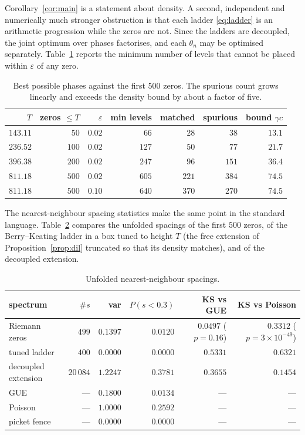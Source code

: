 \documentclass[11pt,a4paper]{article}
\theoremstyle{remark}
\begin{document}
Corollary~\ref{cor:main} is a statement about density. A second, independent and numerically much
stronger obstruction is that each ladder \eqref{eq:ladder} is an arithmetic progression while the
zeros are not. Since the ladders are decoupled, the joint optimum over phases factorises, and each
$\theta_n$ may be optimised separately. Table~\ref{tab:rigid} reports the minimum number of levels
that cannot be placed within $\varepsilon$ of any zero.

\begin{table}[h]
\centering
\begin{tabular}{rrrrrrr}
\toprule
$T$ & zeros $\le T$ & $\varepsilon$ & min levels & matched & spurious & bound $\gamma c$\\
\midrule
$143.11$ & $50$  & $0.02$ & $66$  & $28$  & $38$  & $13.1$\\
$236.52$ & $100$ & $0.02$ & $127$ & $50$  & $77$  & $21.7$\\
$396.38$ & $200$ & $0.02$ & $247$ & $96$  & $151$ & $36.4$\\
$811.18$ & $500$ & $0.02$ & $605$ & $221$ & $384$ & $74.5$\\
$811.18$ & $500$ & $0.10$ & $640$ & $370$ & $270$ & $74.5$\\
\bottomrule
\end{tabular}
\caption{Best possible phases against the first $500$ zeros. The spurious count grows linearly and
exceeds the density bound by about a factor of five.}\label{tab:rigid}
\end{table}

The nearest-neighbour spacing statistics make the same point in the standard language.
Table~\ref{tab:stats} compares the unfolded spacings of the first $500$ zeros, of the
Berry--Keating ladder in a box tuned to height $T$ (the free extension of
Proposition~\ref{prop:dil} truncated so that its density matches), and of the decoupled extension.

\begin{table}[h]
\centering
\begin{tabular}{lrrrrr}
\toprule
spectrum & $\#s$ & var & $P(s<0.3)$ & KS vs GUE & KS vs Poisson\\
\midrule
Riemann zeros & $499$ & $0.1397$ & $0.0120$ & $0.0497$ ($p=0.16$) & $0.3312$ ($p=3\times10^{-49}$)\\
tuned ladder & $400$ & $0.0000$ & $0.0000$ & $0.5331$ & $0.6321$\\
decoupled extension & $20\,084$ & $1.2247$ & $0.3781$ & $0.3655$ & $0.1454$\\
\midrule
GUE & --- & $0.1800$ & $0.0134$ & --- & ---\\
Poisson & --- & $1.0000$ & $0.2592$ & --- & ---\\
picket fence & --- & $0.0000$ & $0.0000$ & --- & ---\\
\bottomrule
\end{tabular}
\caption{Unfolded nearest-neighbour spacings.}\label{tab:stats}
\end{table}
\end{document}
